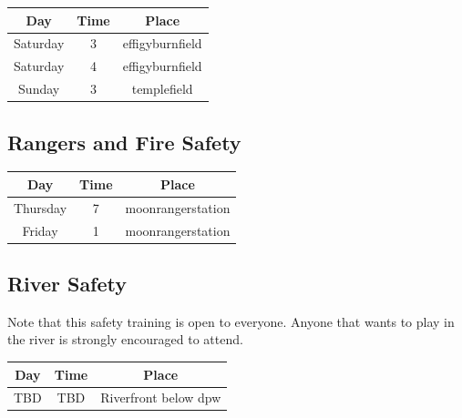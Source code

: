\begin{center}
\footnotesize
\begin{tabular}{|c|c|c|}
\hline
\textbf{Day} & \textbf{Time} & \textbf{Place} \\ \hline
Saturday & 3\pm{} & \gls{effigyburnfield} \\ \hline
Saturday & 4\pm{} & \gls{effigyburnfield} \\ \hline
Sunday & 3\pm{} & \gls{templefield} \\ \hline
\end{tabular}
\end{center}

\subsection*{Rangers and Fire Safety}

\begin{center}
\footnotesize
\begin{tabular}{|c|c|c|}
\hline
\textbf{Day} & \textbf{Time} & \textbf{Place} \\ \hline
Thursday & 7\pm{} & \gls{moonrangerstation} \\ \hline
Friday & 1\pm{} & \gls{moonrangerstation} \\ \hline
\end{tabular}
\end{center}

\subsection*{River Safety}

Note that this safety training is open to everyone.  Anyone that wants to play in the river is strongly encouraged to attend.

\begin{center}
\footnotesize
\begin{tabular}{|c|c|c|}
\hline
\textbf{Day} & \textbf{Time} & \textbf{Place} \\ \hline
TBD & TBD & Riverfront below \gls{dpw} \\ \hline
\end{tabular}
\end{center}


